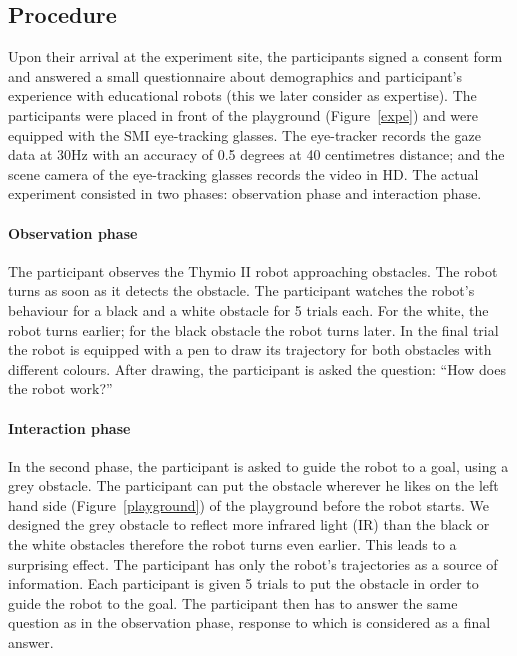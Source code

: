 \documentclass{sig-alternate}
\begin{document}
\subsection{Procedure}

Upon their arrival at the experiment site, the participants signed a consent
form and answered a small questionnaire about demographics and participant's
experience with educational robots (this we later consider as expertise). The
participants were placed in front of the playground (Figure~\ref{expe}) and were
equipped with the SMI eye-tracking glasses. The eye-tracker records the gaze
data at 30Hz with an accuracy of 0.5 degrees at 40 centimetres distance; and the
scene camera of the eye-tracking glasses records the video in HD.  The actual
experiment consisted in two phases: observation phase and interaction phase.

\paragraph{Observation phase} The participant observes the Thymio II robot
approaching obstacles. The robot turns as soon as it detects the
obstacle. The participant watches the robot's behaviour for a black and a
white obstacle for 5 trials each. For the white, the robot turns
earlier; for the black obstacle the robot turns later. In the final
trial the robot is equipped with a pen to draw its trajectory for both
obstacles with different colours. After drawing, the participant is asked
the question: ``How does the robot work?''

\paragraph{Interaction phase} In the second phase, the participant is asked
to guide the robot to a goal, using a grey obstacle. The participant can put the
obstacle wherever he likes on the left hand side (Figure~\ref{playground}) of
the playground before the robot starts. We designed the grey obstacle to reflect
more infrared light (IR) than the black or the white obstacles therefore the
robot turns even earlier. This leads to a surprising effect. The participant has
only the robot's trajectories as a source of information. Each participant is
given 5 trials to put the obstacle in order to guide the robot to the goal. The
participant then has to answer the same question as in the observation phase,
response to which is considered as a final answer.
\end{document}
